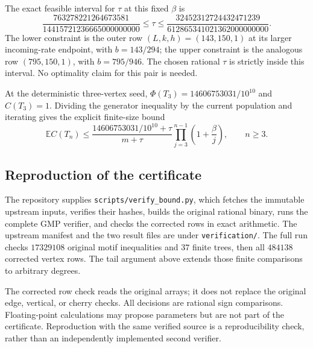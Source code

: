 The exact feasible interval for $\tau$ at this fixed $\beta$ is
\[
 \frac{763278221264673581}{14415721236665000000000}
 \le\tau\le
 \frac{32452312724432471239}{612865341021362000000000}.
\]
The lower constraint is the outer row $(L,k,h)=(143,150,1)$ at its
larger incoming-rate endpoint, with $b=143/294$; the upper constraint
is the analogous row $(795,150,1)$, with $b=795/946$. The chosen
rational $\tau$ is strictly inside this interval. No optimality claim
for this pair is needed.

At the deterministic three-vertex seed,
$\Phi(T_3)=14606753031/10^{10}$ and $C(T_3)=1$. Dividing the generator
inequality by the current population and iterating gives the explicit
finite-size bound
\begin{equation}\label{num:finite-size}
 \mathbb E C(T_n)\le
 \frac{14606753031/10^{10}+\tau}{m+\tau}
 \prod_{j=3}^{n-1}\left(1+\frac\beta j\right),\qquad n\ge3.
\end{equation}

\subsection{Reproduction of the certificate}

The repository supplies \texttt{scripts/verify\_bound.py}, which fetches
the immutable upstream inputs, verifies their hashes, builds the
original rational binary, runs the complete GMP verifier, and checks
the corrected rows in exact arithmetic. The upstream manifest and
the two result files are under \texttt{verification/}. The full run
checks $17329108$ original motif inequalities and $37$ finite trees,
then all $484138$ corrected vertex rows. The tail argument above
extends those finite comparisons to arbitrary degrees.

The corrected row check reads the original arrays; it does not replace
the original edge, vertical, or cherry checks. All decisions are
rational sign comparisons. Floating-point calculations may propose
parameters but are not part of the certificate. Reproduction with the
same verified source is a reproducibility check, rather than an
independently implemented second verifier.
